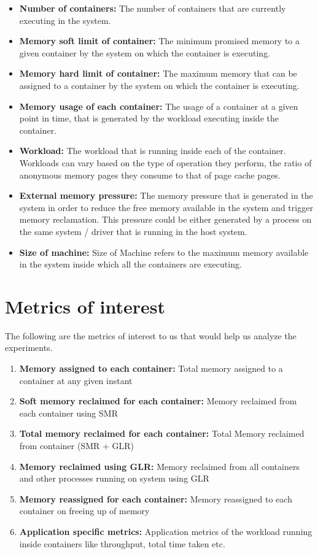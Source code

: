     \begin{itemize}
      \item \textbf{Number of containers:} The number of containers that are currently executing in the system.
      \item \textbf{Memory soft limit of container:} The minimum promised memory to a given container by the system on which the 
container is executing.
      \item \textbf{Memory hard limit of container:} The maximum memory that can be assigned to a container by the system on which the 
container is executing.
      \item \textbf{Memory usage of each container:} The usage of a container at a given point in time, that is generated by the workload 
executing inside the container.
      \item \textbf{Workload:} The workload that is running inside each of the container. Workloads can vary based on the type of operation 
they perform, the ratio of anonymous memory pages they consume to that of page cache pages.  
      \item \textbf{External memory pressure:} The memory pressure that is generated in the system in order to reduce the free memory 
available in the system and trigger memory reclamation. This pressure could be either generated by a process on the same system / driver 
that is running in the host system.
      \item \textbf{Size of machine:} Size of Machine refers to the maximum memory available in the system inside which all the 
containers are executing.      
    \end{itemize}  
  
  \section{Metrics of interest}
  
    The following are the metrics of interest to us that would help us analyze the experiments.
      
	\begin{enumerate}
	 \item \textbf{Memory assigned to each container:} Total memory assigned to a container at any given instant
	 \item \textbf{Soft memory reclaimed for each container:} Memory reclaimed from each container using SMR
	 \item \textbf{Total memory reclaimed for each container:} Total Memory reclaimed from container (SMR + GLR)
	 \item \textbf{Memory reclaimed using GLR:} Memory reclaimed from all containers and other processes running on system using GLR
	 \item \textbf{Memory reassigned for each container:} Memory reassigned to each container on freeing up of memory
	 \item \textbf{Application specific metrics:} Application metrics of the workload running inside containers like throughput, total 
time taken etc.
	\end{enumerate}
  
